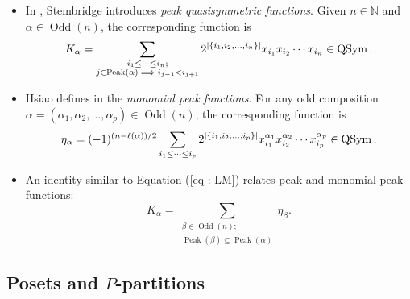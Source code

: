 \documentclass[numbers=enddot,12pt,final,onecolumn,notitlepage]{scrartcl}%
\newcommand{\al}{\alpha}
\newcommand{\NN}{\mathbb{N}} %
\newcommand{\QSym}{\operatorname{QSym}}
\newcommand{\Odd}{\operatorname{Odd}}
\newcommand{\Peak}{\operatorname{Peak}}
\newcommand{\defn}[1]{{\color{darkred}\emph{#1}}}
\newcommand{\0}{\phantom{c}}
\let\sumnonlimits\sum
\renewcommand{\sum}{\sumnonlimits\limits}
\begin{document}
\begin{itemize}
\item In \cite{Ste97}, Stembridge introduces \defn{peak quasisymmetric functions}. Given $n \in \NN$ and $\al \in \Odd(n)$, the corresponding function is
\begin{equation*}
\label{eq : K}
K_{\al} = \sum\limits_{\substack{i_1 \leq \dots \leq i_n;\\j\in \Peak(\al) \implies  i_{j-1}<i_{j+1}}}2^{|\{i_1,i_2,\dots,i_n\}|} x_{i_1}x_{i_2} \cdots x_{i_n} \in \QSym.
\end{equation*}
\item  Hsiao defines in \cite{Hsi07} the \defn{monomial peak functions}. For any odd composition $\al =(\al_1,\al_2,\dots,\al_p)\in \Odd(n)$, the corresponding function is
\begin{equation}
\label{eq : monpeak}
\eta_{\al} = (-1)^{(n-\ell(\al))/2}\sum\limits_{\substack{i_1 \leq \dots \leq i_p}}2^{|\{i_1,i_2,\dots,i_p\}|} x_{i_1}^{\al_1}x_{i_2}^{\al_2} \cdots x_{i_p}^{\al_p} \in \QSym.
\end{equation}
\item An identity similar to Equation (\ref{eq : LM}) relates peak and monomial peak functions:
\begin{equation}
\label{eq : KE} K_{\al} = \sum_{{\substack{\beta \in \Odd(n);\\ \Peak(\beta) \subseteq \Peak(\al)}}} \eta_{\beta}.
\end{equation}
\end{itemize}

\subsection{Posets and $P$-partitions}
\label{sec : poset}
\end{document}
